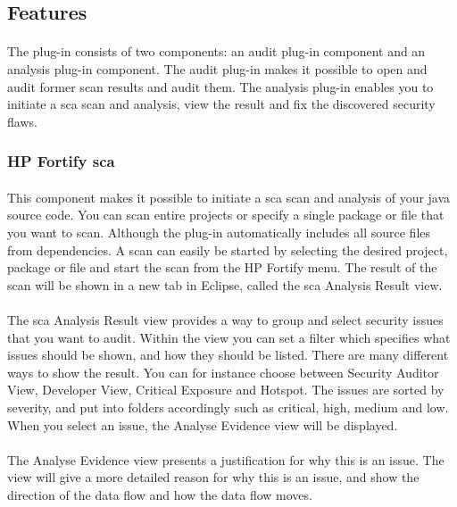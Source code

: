 \documentclass[11pt,english,a4paper]{report}
\begin{document}
\subsection{Features}
\paragraph{}
The plug-in consists of two components: an audit plug-in component and an analysis plug-in component. 
The audit plug-in makes it possible to open and audit former scan results and audit them. 
The analysis plug-in enables you to initiate a \gls{sca} scan and analysis, view the result and fix the discovered security flaws. \cite{installation-usage-guide}

\subsubsection{HP Fortify \gls{sca}}
\paragraph{}
This component makes it possible to initiate a \gls{sca} scan and analysis of your \gls{java} source code.
You can scan entire projects or specify a single package or file that you want to scan. 
Although the plug-in automatically includes all source files from dependencies. 
A scan can easily be started by selecting the desired project, package or file and start the scan from the HP Fortify menu.
The result of the scan will be shown in a new tab in Eclipse, called the \gls{sca} Analysis Result view. \cite{installation-usage-guide}

\paragraph{}
The \gls{sca} Analysis Result view provides a way to group and select security issues that you want to audit. 
Within the view you can set a filter which specifies what issues should be shown, and how they should be listed.
There are many different ways to show the result.
You can for instance choose between Security Auditor View, Developer View, Critical Exposure and Hotspot.
The issues are sorted by severity, and put into folders accordingly such as critical, high, medium and low. 
When you select an issue, the Analyse Evidence view will be displayed. \cite{installation-usage-guide}

\paragraph{}
\label{analyseevidence}
The Analyse Evidence view presents a justification for why this is an issue.
The view will give a more detailed reason for why this is an issue, and show the direction of the data flow and how the data flow moves. \cite{installation-usage-guide}
\end{document}
